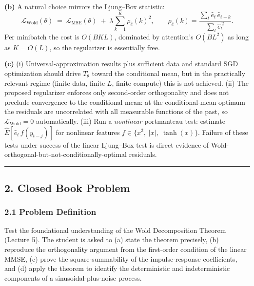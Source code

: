 \documentclass[11pt]{article}
\begin{document}
\textbf{(b)} A natural choice mirrors the Ljung--Box statistic:
\[
\mathcal{L}_{\text{Wold}}(\theta) \;=\; \mathcal{L}_{\text{MSE}}(\theta) \;+\; \lambda \sum_{k=1}^{K} \rho_{\hat e}(k)^2,
\qquad \rho_{\hat e}(k) = \frac{\sum_{t}\hat e_t\,\hat e_{t-k}}{\sum_{t}\hat e_t^{\,2}}.
\]
Per minibatch the cost is $O(BKL)$, dominated by attention's $O(BL^2)$ as long as $K = O(L)$, so the regularizer is essentially free.

\textbf{(c)} (i) Universal-approximation results plus sufficient data and standard SGD optimization should drive $T_\theta$ toward the conditional mean, but in the practically relevant regime (finite data, finite $L$, finite compute) this is not achieved. (ii) The proposed regularizer enforces only second-order orthogonality and does not preclude convergence to the conditional mean: at the conditional-mean optimum the residuals are uncorrelated with all measurable functions of the past, so $\mathcal{L}_{\text{Wold}}=0$ automatically. (iii) Run a \emph{nonlinear} portmanteau test: estimate $\widehat{E}[\hat e_t\, f(y_{t-j})]$ for nonlinear features $f \in \{x^2,\; |x|,\; \tanh(x)\}$. Failure of these tests under success of the linear Ljung--Box test is direct evidence of Wold-orthogonal-but-not-conditionally-optimal residuals.

\noindent\rule{\textwidth}{0.4pt}

\subsection*{2. Closed Book Problem}

\vspace{1em}

\subsubsection*{2.1 Problem Definition}
Test the foundational understanding of the Wold Decomposition Theorem (Lecture 5). The student is asked to (a) state the theorem precisely, (b) reproduce the orthogonality argument from the first-order condition of the linear MMSE, (c) prove the square-summability of the impulse-response coefficients, and (d) apply the theorem to identify the deterministic and indeterministic components of a sinusoidal-plus-noise process.
\end{document}
